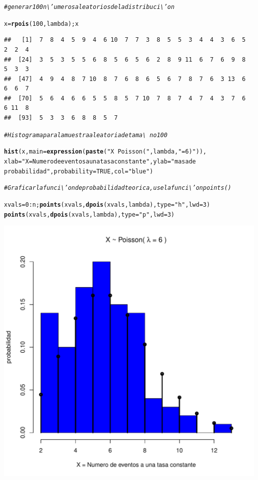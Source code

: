 \documentclass[12pt,letterpaper]{article}\usepackage[]{graphicx}\usepackage[]{color}
\makeatletter
\def\maxwidth{ %
  \ifdim\Gin@nat@width>\linewidth
    \linewidth
  \else
    \Gin@nat@width
  \fi
}
\newcommand{\hlnum}[1]{\textcolor[rgb]{0.686,0.059,0.569}{#1}}%
\newcommand{\hlstr}[1]{\textcolor[rgb]{0.192,0.494,0.8}{#1}}%
\newcommand{\hlcom}[1]{\textcolor[rgb]{0.678,0.584,0.686}{\textit{#1}}}%
\newcommand{\hlopt}[1]{\textcolor[rgb]{0,0,0}{#1}}%
\newcommand{\hlstd}[1]{\textcolor[rgb]{0.345,0.345,0.345}{#1}}%
\newcommand{\hlkwb}[1]{\textcolor[rgb]{0.69,0.353,0.396}{#1}}%
\newcommand{\hlkwc}[1]{\textcolor[rgb]{0.333,0.667,0.333}{#1}}%
\newcommand{\hlkwd}[1]{\textcolor[rgb]{0.737,0.353,0.396}{\textbf{#1}}}%
\newenvironment{kframe}{%
 \def\at@end@of@kframe{}%
 \ifinner\ifhmode%
  \def\at@end@of@kframe{\end{minipage}}%
  \begin{minipage}{\columnwidth}%
 \fi\fi%
 \def\FrameCommand##1{\hskip\@totalleftmargin \hskip-\fboxsep
 \colorbox{shadecolor}{##1}\hskip-\fboxsep
     \hskip-\linewidth \hskip-\@totalleftmargin \hskip\columnwidth}%
 \MakeFramed {\advance\hsize-\width
   \@totalleftmargin\z@ \linewidth\hsize
   \@setminipage}}%
 {\par\unskip\endMakeFramed%
 \at@end@of@kframe}
\newenvironment{knitrout}{}{} %
\makeatother
\begin{document}
\begin{itemize}
\begin{knitrout}
\begin{kframe}
\begin{alltt}
\hlcom{# generar 100 n\textbackslash{}'umeros aleatorios de la distribuci\textbackslash{}'on}

\hlstd{x} \hlkwb{=} \hlkwd{rpois}\hlstd{(}\hlnum{100}\hlstd{, lambda); x}
\end{alltt}
\begin{verbatim}
##   [1]  7  8  4  5  9  4  6 10  7  7  3  8  5  5  3  4  4  3  6  5  2  2  4
##  [24]  3  5  3  5  5  6  8  5  6  5  6  2  8  9 11  6  7  6  9  8  5  3  3
##  [47]  4  9  4  8  7 10  8  7  6  8  6  5  6  7  8  7  6  3 13  6  6  6  7
##  [70]  5  6  4  6  6  5  5  8  5  7 10  7  8  7  4  7  4  3  7  6  6 11  8
##  [93]  5  3  3  6  8  8  5  7
\end{verbatim}
\begin{alltt}
\hlcom{# Histograma para la muestra aleatoria de tama\textbackslash{}~no 100}

\hlkwd{hist}\hlstd{(x,} \hlkwc{main}\hlstd{=}\hlkwd{expression}\hlstd{(}\hlkwd{paste}\hlstd{(}\hlstr{"X ~ Poisson( "}\hlstd{, lambda,} \hlstr{" = 6 )"}\hlstd{)),}
\hlkwc{xlab}\hlstd{=}\hlstr{"X = Numero de eventos a una tasa constante"}\hlstd{,} \hlkwc{ylab}\hlstd{=}\hlstr{"masa de 
probabilidad"}\hlstd{,} \hlkwc{probability}\hlstd{=}\hlnum{TRUE}\hlstd{,} \hlkwc{col}\hlstd{=}\hlstr{"blue"}\hlstd{)}

\hlcom{# Graficar la funci\textbackslash{}'on de probabilidad teorica, use la funci\textbackslash{}'on points()}

\hlstd{xvals}\hlkwb{=}\hlnum{0}\hlopt{:}\hlstd{n;} \hlkwd{points}\hlstd{(xvals,} \hlkwd{dpois}\hlstd{(xvals, lambda),} \hlkwc{type}\hlstd{=}\hlstr{"h"}\hlstd{,} \hlkwc{lwd}\hlstd{=}\hlnum{3}\hlstd{)}
\hlkwd{points}\hlstd{(xvals,} \hlkwd{dpois}\hlstd{(xvals, lambda),} \hlkwc{type}\hlstd{=}\hlstr{"p"}\hlstd{,} \hlkwc{lwd}\hlstd{=}\hlnum{3}\hlstd{)}
\end{alltt}
\end{kframe}
\includegraphics[width=\maxwidth]{figure/unnamed-chunk-30-1} 


\end{knitrout}
\end{itemize}
\end{document}
